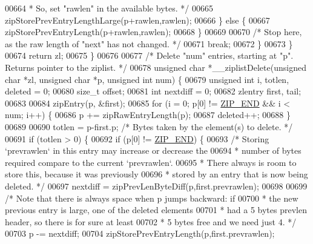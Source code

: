 \begin{DoxyCode}
{{00664 \textcolor{comment}{                 * So, set "rawlen" in the available bytes. */}
00665                 zipStorePrevEntryLengthLarge(p+rawlen,rawlen);
00666             \} \textcolor{keywordflow}{else} \{
00667                 zipStorePrevEntryLength(p+rawlen,rawlen);
00668             \}
00669 
00670             \textcolor{comment}{/* Stop here, as the raw length of "next" has not changed. */}
00671             \textcolor{keywordflow}{break};
00672         \}
00673     \}
00674     \textcolor{keywordflow}{return} zl;
00675 \}
00676 
00677 \textcolor{comment}{/* Delete "num" entries, starting at "p". Returns pointer to the ziplist. */}
00678 \textcolor{keywordtype}{unsigned} \textcolor{keywordtype}{char} *\_\_ziplistDelete(\textcolor{keywordtype}{unsigned} \textcolor{keywordtype}{char} *zl, \textcolor{keywordtype}{unsigned} \textcolor{keywordtype}{char} *p, \textcolor{keywordtype}{unsigned} \textcolor{keywordtype}{int} num) \{
00679     \textcolor{keywordtype}{unsigned} \textcolor{keywordtype}{int} i, totlen, deleted = 0;
00680     size\_t offset;
00681     \textcolor{keywordtype}{int} nextdiff = 0;
00682     zlentry first, tail;
00683 
00684     zipEntry(p, &first);
00685     \textcolor{keywordflow}{for} (i = 0; p[0] != \hyperlink{ziplist_8c_a31a8f9d5b5bad75318741cfca5de5ea8}{ZIP\_END} && i < num; i++) \{
00686         p += zipRawEntryLength(p);
00687         deleted++;
00688     \}
00689 
00690     totlen = p-first.p; \textcolor{comment}{/* Bytes taken by the element(s) to delete. */}
00691     \textcolor{keywordflow}{if} (totlen > 0) \{
00692         \textcolor{keywordflow}{if} (p[0] != \hyperlink{ziplist_8c_a31a8f9d5b5bad75318741cfca5de5ea8}{ZIP\_END}) \{
00693             \textcolor{comment}{/* Storing `prevrawlen` in this entry may increase or decrease the}
00694 \textcolor{comment}{             * number of bytes required compare to the current `prevrawlen`.}
00695 \textcolor{comment}{             * There always is room to store this, because it was previously}
00696 \textcolor{comment}{             * stored by an entry that is now being deleted. */}
00697             nextdiff = zipPrevLenByteDiff(p,first.prevrawlen);
00698 
00699             \textcolor{comment}{/* Note that there is always space when p jumps backward: if}
00700 \textcolor{comment}{             * the new previous entry is large, one of the deleted elements}
00701 \textcolor{comment}{             * had a 5 bytes prevlen header, so there is for sure at least}
00702 \textcolor{comment}{             * 5 bytes free and we need just 4. */}
00703             p -= nextdiff;
00704             zipStorePrevEntryLength(p,first.prevrawlen);
}}
\end{DoxyCode}
